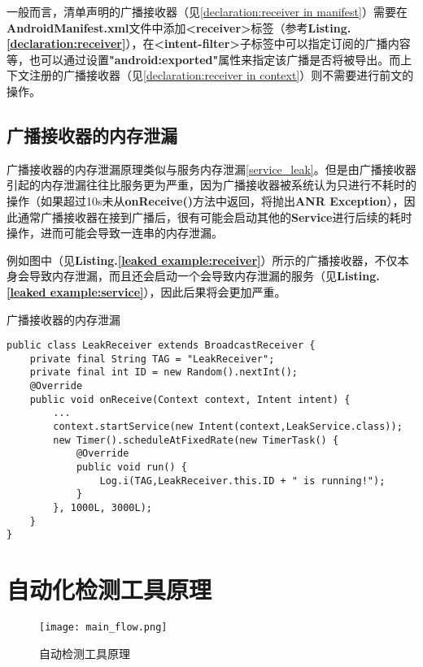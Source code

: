 一般而言，清单声明的广播接收器（见\ref{declaration:receiver in manifest}）需要在\textbf{AndroidManifest.xml}文件中添加\textbf{<receiver>}标签（参考\textbf{Listing.\textcolor{red}{\ref{declaration:receiver}}}），在\textbf{<intent-filter>}子标签中可以指定订阅的广播内容等，也可以通过设置\textbf{"android:exported"}属性来指定该广播是否将被导出。而上下文注册的广播接收器（见\ref{declaration:receiver in context}）则不需要进行前文的操作。
\subsection{广播接收器的内存泄漏}
广播接收器的内存泄漏原理类似与服务内存泄漏\ref{service_leak}。但是由广播接收器引起的内存泄漏往往比服务更为严重，因为广播接收器被系统认为只进行不耗时的操作（如果超过10s未从\textbf{onReceive()}方法中返回，将抛出\textbf{ANR Exception}），因此通常广播接收器在接到广播后，很有可能会启动其他的\textbf{Service}进行后续的耗时操作，进而可能会导致一连串的内存泄漏。

例如图中（见\textbf{Listing.\textcolor{red}{\ref{leaked example:receiver}}}）所示的广播接收器，不仅本身会导致内存泄漏，而且还会启动一个会导致内存泄漏的服务（见\textbf{Listing.\textcolor{red}{\ref{leaked example:service}}}），因此后果将会更加严重。
\begin{listing}[htbp]
	\centering
	\caption{广播接收器的内存泄漏}
	\begin{verbatim}
public class LeakReceiver extends BroadcastReceiver {
	private final String TAG = "LeakReceiver";
	private final int ID = new Random().nextInt();
	@Override
	public void onReceive(Context context, Intent intent) {
		...
		context.startService(new Intent(context,LeakService.class));
		new Timer().scheduleAtFixedRate(new TimerTask() {
			@Override
			public void run() {
				Log.i(TAG,LeakReceiver.this.ID + " is running!");
			}
		}, 1000L, 3000L);
	}
}
	\end{verbatim}
	\label{leaked example:receiver}
\end{listing}
\section{自动化检测工具原理}
\begin{figure}[htbp]
	\centering
	\texttt{[image: main\_flow.png]} %
	\caption{自动检测工具原理}
	\label{fig:flow}
\end{figure}

